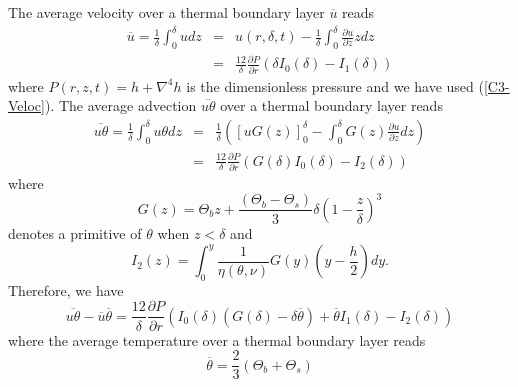   The average  velocity over  a thermal boundary  layer $\overline{u}$
  reads
  \begin{eqnarray}
    \overline{u}        =\frac{1}{\delta}\int_0^{\delta}udz        &=&
                                                                       u(r,\delta,t) - \frac{1}{\delta}\int_0^{\delta}\frac{\partial
                                                                       u}{\partial z} zdz\\
                                                                   &=&\frac{12}{\delta}
                                                                       \frac{\partial
                                                                       P}{\partial
                                                                       r}\left(\delta
                                                                       I_0(\delta)-I_1(\delta)\right)
  \end{eqnarray}
  where $P(r,z,t) = h+\nabla^4h$ is  the dimensionless pressure and we
  have     used    (\ref{C3-Veloc}).      The    average     advection
  $\overline{u\theta}$ over a thermal boundary layer reads
  \begin{eqnarray}
    \overline{u\theta}=\frac{1}{\delta}\int_0^{\delta}u\theta dz &=& \frac{1}{\delta}\left( [ uG(z) ]_{0}^{\delta} -\int_0^\delta
                                                                     G(z)\frac{\partial
                                                                     u}{\partial
                                                                     z}
                                                                     dz\right)\nonumber\\
                                                                 &=&\frac{12}{\delta} \frac{\partial P}{\partial r}\left(G(\delta)I_0(\delta)-I_2(\delta)\right)
  \end{eqnarray}
  where
  \begin{equation}
    G(z)                  =                 \Theta_b                  z
    +\frac{\left(\Theta_b-\Theta_s\right)}{3}\delta\left(1-\frac{z}{\delta}\right)^3
  \end{equation}
  denotes a primitive of $\theta$ when $z<\delta$ and
  \begin{equation}
    I_2(z)=\int_0^y                         \frac{1}{\eta(\theta,\nu)}G(y)
    \left(y-\frac{h}{2}\right)dy.
  \end{equation}
  Therefore, we have
  \begin{equation}
    \overline{u\theta}-\overline{u}\overline{\theta}= \frac{12}{\delta} \frac{\partial P}{\partial r}\left(I_0(\delta)\left(G(\delta)-\delta\overline{\theta}\right)+\overline{\theta}I_1(\delta)-I_2(\delta)\right)
  \end{equation} 
  where the average temperature over a thermal boundary layer reads
  \begin{equation}
    \overline{\theta} = \frac{2}{3}\left( \Theta_{b}+\Theta_{s}\right)
    \label{C3-tbar}
  \end{equation}

